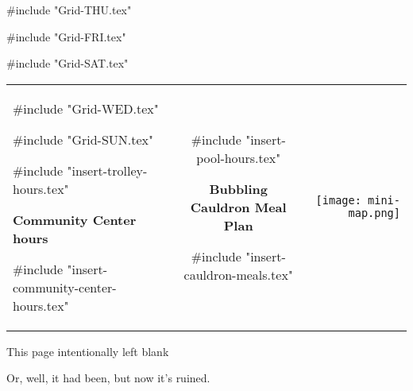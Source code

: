\documentclass[legalpaper,9pt,twoside,openright,final,article,landscape]{memoir}
\date{\today}
\title{\festseason \festyear}
\author{Temple of Earth Gatherings \\ Florida Pagan Gathering}
\renewcommand{\subsection}[1]{%
  \vspace{6pt}%
  \needspace{1.25in}%
  \begin{center}\textbf{\Large \beltanefamily #1}\end{center}

  \nopagebreak}
\begin{document}
#include "Grid-THU.tex"

\vfill 

#include "Grid-FRI.tex"

\newpage

#include "Grid-SAT.tex"

\small

\begin{tabular}{lcr}

\begin{minipage}{7in}

\small

#include "Grid-WED.tex"

#include "Grid-SUN.tex"

#include "insert-trolley-hours.tex"

\subsection{Community Center hours}

#include "insert-community-center-hours.tex"
\end{minipage} & \begin{minipage}{3in}

  #include "insert-pool-hours.tex"

\subsection{Bubbling Cauldron Meal Plan}

#include "insert-cauldron-meals.tex"

\end{minipage} & \begin{minipage}

\texttt{[image: mini-map.png]}

\end{minipage}
\end{tabular}

\pagebreak

This page intentionally left blank

\vfill

Or, well, it had been, but now it's ruined.

\thispagestyle{headings}
\newpage
\pagestyle{empty}

\thispagestyle{empty}

\end{document}
